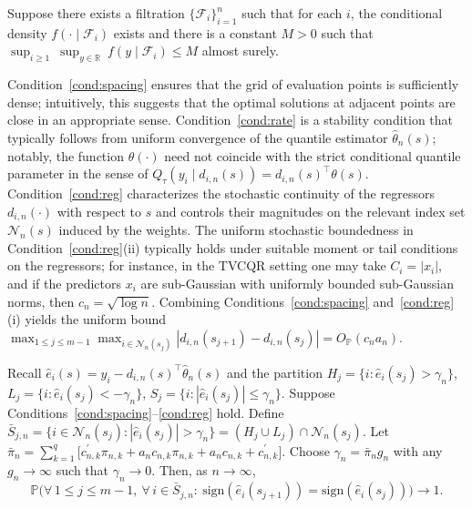 \documentclass[lineno]{biometrika}
\begin{document}
\begin{condition}\label{cond:density}
Suppose there exists a filtration $\{\mathcal F_i\}_{i=1}^n$ such that
for each $i$, the conditional density $f(\cdot\mid\mathcal F_i)$ exists and there is a constant $M>0$ such that $\sup_{i\ge1}\ \sup_{y\in\mathbb R}\ f(y\mid\mathcal F_i)\le M$ almost surely.
\end{condition}


\begin{remark}
Condition~\ref{cond:spacing} ensures that the grid of evaluation points is sufficiently dense; intuitively, this suggests that the optimal solutions at adjacent points are close in an appropriate sense.
Condition~\ref{cond:rate} is a stability condition that typically follows from uniform convergence of the quantile estimator $\hat\theta_n(s)$; notably, the function $\theta(\cdot)$ need not coincide with the strict conditional quantile parameter in the sense of $Q_\tau(y_i\mid d_{i,n}(s))=d_{i,n}(s)^\top\theta(s)$.
Condition~\ref{cond:reg} characterizes the stochastic continuity of the regressors $d_{i,n}(\cdot)$ with respect to $s$ and controls their magnitudes on the relevant index set $\mathcal N_n(s)$ induced by the weights.
The uniform stochastic boundedness in Condition~\ref{cond:reg}(ii) typically holds under suitable moment or tail conditions on the regressors; for instance, in the TVCQR setting one may take $C_i=|x_i|$, and if the predictors $x_i$ are sub-Gaussian with uniformly bounded sub-Gaussian norms, then $c_n=\sqrt{\log n}$.
Combining Conditions~\ref{cond:spacing} and~\ref{cond:reg}(i) yields the uniform bound
$\max_{1\le j\le m-1}\max_{i\in\mathcal N_n(s_j)}|d_{i,n}(s_{j+1})-d_{i,n}(s_j)|=O_{\mathbb P}(c_n a_n)$.
\end{remark}

\begin{theorem}\label{thm:signstability}
Recall $\hat e_i(s)=y_i-d_{i,n}(s)^\top\hat\theta_n(s)$ and the partition
$H_j=\{i:\hat e_i(s_j)>\gamma_n\}$, $L_j=\{i:\hat e_i(s_j)<-\gamma_n\}$, $S_j=\{i:|\hat e_i(s_j)|\le \gamma_n\}$.
Suppose Conditions~\ref{cond:spacing}--\ref{cond:reg} hold. Define
$\bar S_{j,n}=\{i\in\mathcal N_n(s_j):|\hat e_i(s_j)|>\gamma_n\}=(H_j\cup L_j)\cap\mathcal N_n(s_j)$.
Let $\bar\pi_n=\sum_{k=1}^q \big[c^{\prime}_{n,k} \pi_{n,k}+ a_n c_{n,k} \pi_{n,k}+ a_n c_{n,k}+c_{n,k}^\prime\big]$.
Choose $\gamma_n=\bar\pi_n g_n$ with any $g_n\to\infty$ such that $\gamma_n\to 0$. Then, as $n\to\infty$,
\[
\mathbb P\big(\forall\,1\le j\le m-1,\ \forall\,i\in\bar S_{j,n}:\ \mathrm{sign}(\hat e_i(s_{j+1}))=\mathrm{sign}(\hat e_i(s_j))\big)\to 1.
\]
\end{theorem}
\end{document}
